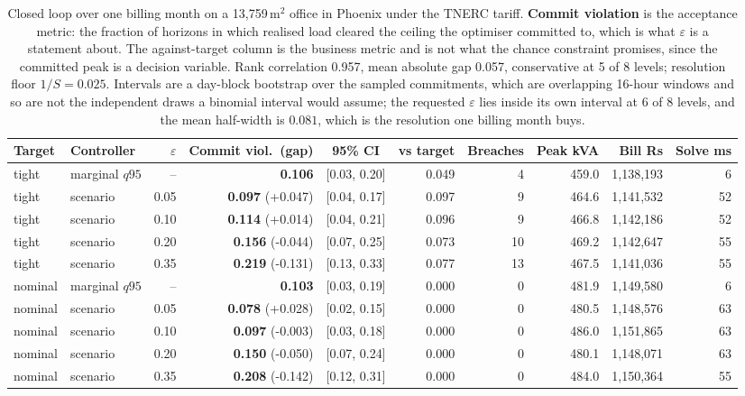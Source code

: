 \begin{table}[t]
\centering
\scriptsize
\setlength{\tabcolsep}{3pt}
\begin{tabular}{llrrcrrrrr}
\toprule
Target & Controller & $\varepsilon$ & Commit viol.\ (gap) & 95\% CI & vs target & Breaches & Peak kVA & Bill Rs & Solve ms \\
\midrule
tight & marginal $q95$ & -- & \textbf{0.106} & [0.03, 0.20] & 0.049 & 4 & 459.0 & 1,138,193 & 6 \\
tight & scenario & 0.05 & \textbf{0.097} (+0.047) & [0.04, 0.17] & 0.097 & 9 & 464.6 & 1,141,532 & 52 \\
tight & scenario & 0.10 & \textbf{0.114} (+0.014) & [0.04, 0.21] & 0.096 & 9 & 466.8 & 1,142,186 & 52 \\
tight & scenario & 0.20 & \textbf{0.156} (-0.044) & [0.07, 0.25] & 0.073 & 10 & 469.2 & 1,142,647 & 55 \\
tight & scenario & 0.35 & \textbf{0.219} (-0.131) & [0.13, 0.33] & 0.077 & 13 & 467.5 & 1,141,036 & 55 \\
nominal & marginal $q95$ & -- & \textbf{0.103} & [0.03, 0.19] & 0.000 & 0 & 481.9 & 1,149,580 & 6 \\
nominal & scenario & 0.05 & \textbf{0.078} (+0.028) & [0.02, 0.15] & 0.000 & 0 & 480.5 & 1,148,576 & 63 \\
nominal & scenario & 0.10 & \textbf{0.097} (-0.003) & [0.03, 0.18] & 0.000 & 0 & 486.0 & 1,151,865 & 63 \\
nominal & scenario & 0.20 & \textbf{0.150} (-0.050) & [0.07, 0.24] & 0.000 & 0 & 480.1 & 1,148,071 & 63 \\
nominal & scenario & 0.35 & \textbf{0.208} (-0.142) & [0.12, 0.31] & 0.000 & 0 & 484.0 & 1,150,364 & 55 \\
\bottomrule
\end{tabular}
\caption{Closed loop over one billing month on a 13{,}759\,m$^2$ office in Phoenix under the TNERC tariff. \textbf{Commit violation} is the acceptance metric: the fraction of horizons in which realised load cleared the ceiling the optimiser committed to, which is what $\varepsilon$ is a statement about. The against-target column is the business metric and is not what the chance constraint promises, since the committed peak is a decision variable. Rank correlation 0.957, mean absolute gap 0.057, conservative at 5 of 8 levels; resolution floor $1/S=0.025$. Intervals are a day-block bootstrap over the sampled commitments, which are overlapping 16-hour windows and so are not the independent draws a binomial interval would assume; the requested $\varepsilon$ lies inside its own interval at 6 of 8 levels, and the mean half-width is $0.081$, which is the resolution one billing month buys.}
\label{tab:acceptance}
\end{table}
